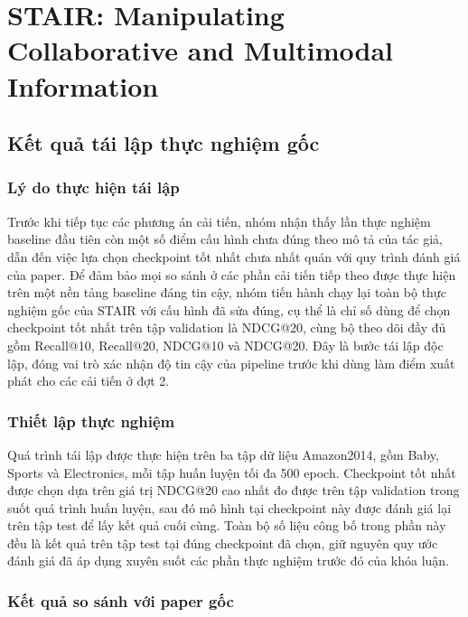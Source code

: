 \section{STAIR: Manipulating Collaborative and Multimodal Information}

\subsection{Kết quả tái lập thực nghiệm gốc}
\label{sec:stair_reproduction}

\subsubsection{Lý do thực hiện tái lập}

Trước khi tiếp tục các phương án cải tiến, nhóm nhận thấy lần thực nghiệm baseline đầu tiên còn một số điểm cấu hình chưa đúng theo mô tả của tác giả, dẫn đến việc lựa chọn checkpoint tốt nhất chưa nhất quán với quy trình đánh giá của paper. Để đảm bảo mọi so sánh ở các phần cải tiến tiếp theo được thực hiện trên một nền tảng baseline đáng tin cậy, nhóm tiến hành chạy lại toàn bộ thực nghiệm gốc của STAIR với cấu hình đã sửa đúng, cụ thể là chỉ số dùng để chọn checkpoint tốt nhất trên tập validation là NDCG@20, cùng bộ theo dõi đầy đủ gồm Recall@10, Recall@20, NDCG@10 và NDCG@20. Đây là bước tái lập độc lập, đóng vai trò xác nhận độ tin cậy của pipeline trước khi dùng làm điểm xuất phát cho các cải tiến ở đợt 2.

\subsubsection{Thiết lập thực nghiệm}

Quá trình tái lập được thực hiện trên ba tập dữ liệu Amazon2014, gồm Baby, Sports và Electronics, mỗi tập huấn luyện tối đa 500 epoch. Checkpoint tốt nhất được chọn dựa trên giá trị NDCG@20 cao nhất đo được trên tập validation trong suốt quá trình huấn luyện, sau đó mô hình tại checkpoint này được đánh giá lại trên tập test để lấy kết quả cuối cùng. Toàn bộ số liệu công bố trong phần này đều là kết quả trên tập test tại đúng checkpoint đã chọn, giữ nguyên quy ước đánh giá đã áp dụng xuyên suốt các phần thực nghiệm trước đó của khóa luận.

\subsubsection{Kết quả so sánh với paper gốc}

